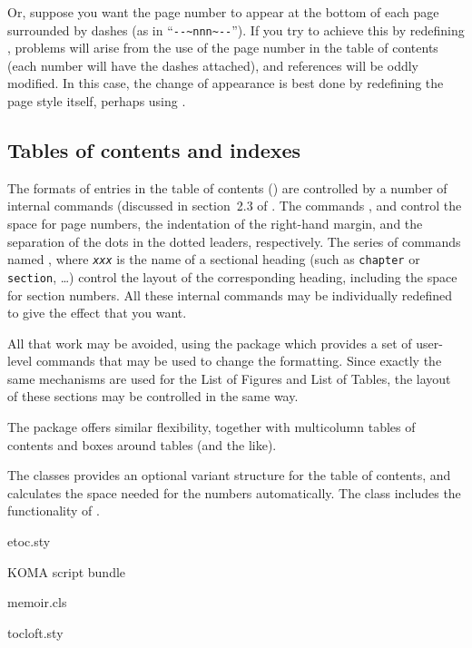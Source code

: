 Or, suppose you want the page number to appear at the bottom of each
page surrounded by dashes (as in
``\texttt{-}{}\texttt{-\textasciitilde}\texttt{nnn\textasciitilde-}{}\texttt{-}'').
If you try to achieve this by redefining , problems will
arise from the use of the page number in the table of contents (each
number will have the dashes attached), and  references
will be oddly modified.  In this case, the change of appearance is
best done by redefining the page style itself, perhaps using
.

\subsection{Tables of contents and indexes}


The formats of entries in the table of contents () are
controlled by a number of internal commands (discussed in section~2.3
of .  The commands
,  and  control the space
for page numbers, the indentation of the right-hand margin, and the
separation of the dots in the dotted leaders, respectively.  The
series of commands named , where \texttt{\emph{xxx}}
is the name of a sectional heading (such as \texttt{chapter} or
\texttt{section}, \dots{}\@) control the layout of the corresponding
heading, including the space for section numbers.  All these internal
commands may be individually redefined to give the effect that you
want.

All that work may be avoided, using the package 
which provides a set of user-level commands that may be used to change
the  formatting.  Since exactly the same mechanisms are used
for the List of Figures and List of Tables, the layout of these
sections may be controlled in the same way.

The  package offers similar flexibility, together with
multicolumn tables of contents and boxes around tables (and the like).

The  classes provides an optional variant structure
for the table of contents, and calculates the space needed for the
numbers automatically.  The  class includes the functionality
of .
\begin{ctanrefs}
\item[etoc.sty]
\item[\nothtml{\rmfamily}KOMA script bundle]
\item[memoir.cls]
\item[tocloft.sty]
\end{ctanrefs}

